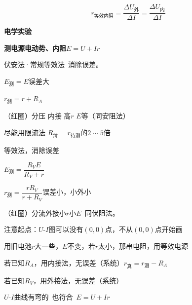 \[
r_{\text{等效内阻}}=\frac{\Delta U_{\text{外}}}{\Delta I}=\frac{\Delta U_{\text{内}}}{\Delta I}
\]

\textbf{电学实验}

\textbf{测电源电动势、内阻}\qquad $E=U+Ir$

伏安法·常规\qquad 等效法\ 消除误差。

\begin{minipage}[t]{0.50\linewidth}
\end{minipage}\hfill
\begin{minipage}[t]{0.46\linewidth}
\end{minipage}

$E_{\text{测}}=E$\qquad 误差大 

$r_{\text{测}}=r+R_A$

（红圈）分压 内接 高$r$ $E$等（同安阻法）

尽能用限流法 %
\quad $R_{\text{滑}}=r_{\text{待测}}$的$2\sim5$倍

\begin{minipage}[t]{0.50\linewidth}
\end{minipage}\hfill
\begin{minipage}[t]{0.46\linewidth}
\end{minipage}

等效法，消除误差

$E_{\text{测}}=\dfrac{R_VE}{R_V+r}$

$r_{\text{测}}=\dfrac{rR_V}{r+R_V}$\qquad 误差小，小外小

（红圈）分流外接小$r$小$E$\ 同伏阻法。

注意起点：$U$-$I$图可以没有$(0,0)$点，不从$(0,0)$点开始画

用旧电池$r$大一些，$E$不变，若$r$太小，那串电阻，用等效电源

若已知$R_A$，用内接法，无误差（系统）\qquad $r_{\text{真}}=r_{\text{测}}-R_A$

若已知$R_V$，用外接法，无误差（系统）

$U$-$I$曲线有弯的\ 也符合\ $E=U+Ir$

